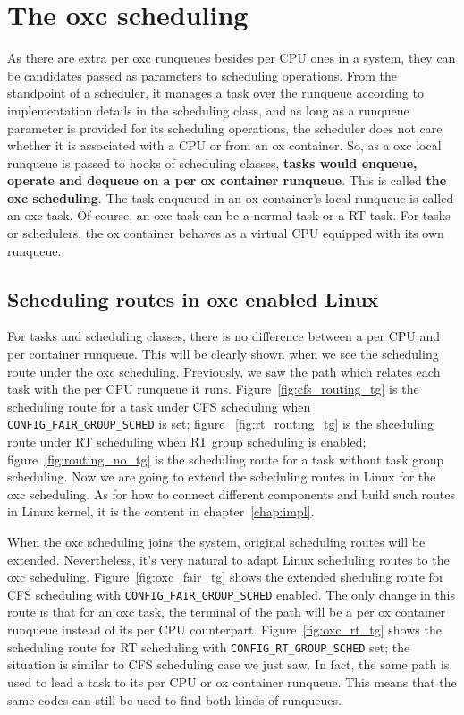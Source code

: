 \section{The oxc scheduling\label{sec:design_oxc_scheduling}}
As there are extra per oxc runqueues besides 
per CPU ones in a system, they can be candidates passed as parameters to 
scheduling operations. From the standpoint of a scheduler, it manages a task 
over the runqueue according to implementation details in the scheduling class, 
and as long as a runqueue parameter is provided for its scheduling operations, 
the scheduler does not care whether it is associated with a CPU or from an ox 
container. So, as a oxc local runqueue is passed to hooks of scheduling 
classes, \textbf{tasks would enqueue, operate and dequeue on a per ox 
container runqueue}. This is called \textbf{the oxc scheduling}. The task 
enqueued in an ox container's local runqueue is called an oxc task. Of 
course, an oxc task can be a normal task or a RT task. For tasks or 
schedulers, the ox container behaves as a virtual CPU equipped with its
own runqueue.

\subsection{Scheduling routes in oxc enabled Linux 
\label{sec_design_oxc_routing}}

For tasks and scheduling classes, there is no difference between a per CPU 
and per container runqueue. This will be clearly shown when we see the 
scheduling route under the oxc scheduling. Previously, we saw
the path which relates each task with the per CPU runqueue it runs.
Figure~\vref{fig:cfs_routing_tg} is the scheduling route for a task under 
CFS scheduling when \texttt{CONFIG\_FAIR\_GROUP\_SCHED} is set; figure~ 
\vref{fig:rt_routing_tg} is the shceduling route under RT scheduling when 
RT group scheduling is enabled; figure~\vref{fig:routing_no_tg} is the 
scheduling route for a task without task group scheduling.
Now we are going to extend the scheduling routes in Linux for 
the oxc scheduling. As for how to connect different components and 
build such routes in Linux kernel, it is the content in 
chapter~\ref{chap:impl}.

When the oxc scheduling joins the system, original scheduling routes
will be extended. Nevertheless, it's very natural to adapt Linux 
scheduling routes to the oxc scheduling.
Figure~\ref{fig:oxc_fair_tg} shows the extended sheduling route for CFS
scheduling with \texttt{CONFIG\_FAIR\_GROUP\_SCHED} enabled. The only
change in this route is that for an oxc task, the terminal of the path 
will be a per ox container runqueue instead of its per CPU counterpart.
Figure~\ref{fig:oxc_rt_tg} shows the scheduling route for RT scheduling 
with \texttt{CONFIG\_RT\_GROUP\_SCHED} set; the situation is similar to 
CFS scheduling case we just saw. In fact, the same path is used to lead
a task to its per CPU or ox container runqueue. This means that the same 
codes can still be used to find both kinds of runqueues.

